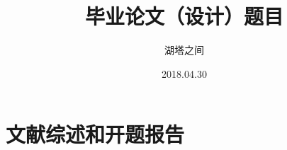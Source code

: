 \documentclass[fangfont=STFANGSO.TTF,heifont=simhei.ttf,nocolorbib]{zju-thesis}
\title{毕业论文（设计）题目}{浙江大学本科生毕业论文（设计）}
\author{湖塔之间}{3140100000}
\date{2018.04.30}
\begin{document}
	\makecover
	
	
	\clearpage
	
    \tableofcontents
	\begin{refsection}
	
	\end{refsection}
	
	
	
	\part{文献综述和开题报告}
	\renewcommand\thechapter{\zhnum{chapter}、} 
	
\end{document}
